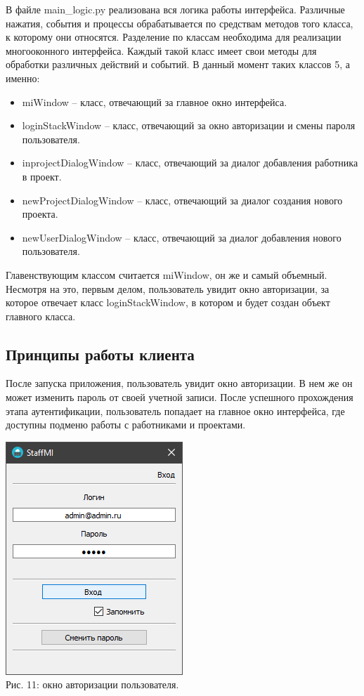 \documentclass[14pt, a4paper]{extarticle}
\begin{document}
    В файле main\_logic.py реализована вся логика работы интерфейса. Различные нажатия, события и процессы обрабатывается по средствам методов того класса, к которому они относятся. Разделение по классам необходима для реализации многооконного интерфейса. Каждый такой класс имеет свои методы для обработки различных действий и событий. В данный момент таких классов 5, а именно:
    \begin{itemize}
        \item miWindow – класс, отвечающий за главное окно интерфейса.
        \item loginStackWindow – класс, отвечающий за окно авторизации и смены пароля пользователя.
        \item inprojectDialogWindow – класс, отвечающий за диалог добавления работника в проект.
        \item newProjectDialogWindow – класс, отвечающий за диалог создания нового проекта.
        \item newUserDialogWindow – класс, отвечающий за диалог добавления нового пользователя.
    \end{itemize}

    Главенствующим классом считается miWindow, он же и самый объемный. Несмотря на это, первым делом, пользователь увидит окно авторизации, за которое отвечает класс loginStackWindow, в котором и будет создан объект главного класса.


    \newpage
    \subsection{Принципы работы клиента}
    После запуска приложения, пользователь увидит окно авторизации. В нем же он может изменить пароль от своей учетной записи. После успешного прохождения этапа аутентификации, пользователь попадает на главное окно интерфейса, где доступны подменю работы с работниками и проектами.
    \begin{center}
        \includegraphics[scale=0.7]{img/auth_window_win.png}\\
        Рис. 11: окно авторизации пользователя.\\[\baselineskip]
    \end{center}
\end{document}
